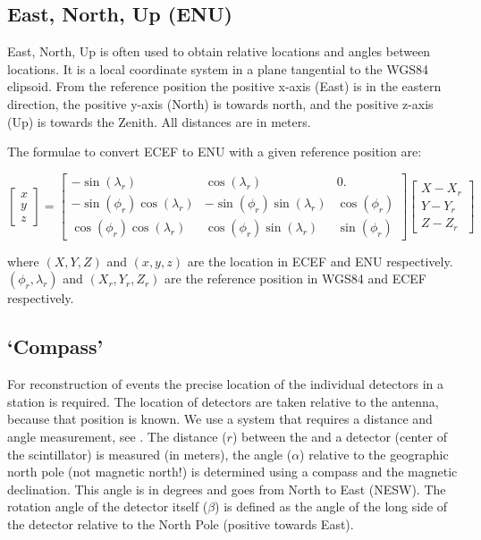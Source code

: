 \subsection{East, North, Up (ENU)}

East, North, Up is often used to obtain relative locations and angles
between locations. It is a local coordinate system in a plane tangential
to the WGS84 elipsoid. From the reference position the positive x-axis
(East) is in the eastern direction, the positive y-axis (North) is
towards north, and the positive z-axis (Up) is towards the Zenith. All
distances are in meters.

The formulae to convert ECEF to ENU with a given reference position are:

\begin{equation}
    \begin{bmatrix}
    x \\ y \\ z
    \end{bmatrix}
    =
    \begin{bmatrix}
                 -\sin(\lambda_r) &               \cos(\lambda_r) &           0. \\
    -\sin(\phi_r) \cos(\lambda_r) & -\sin(\phi_r) \sin(\lambda_r) & \cos(\phi_r) \\
     \cos(\phi_r) \cos(\lambda_r) &  \cos(\phi_r) \sin(\lambda_r) & \sin(\phi_r)
    \end{bmatrix}
    \begin{bmatrix}
    X - X_r \\ Y - Y_r \\ Z - Z_r
    \end{bmatrix}
\end{equation}

where  $(X, Y, Z)$ and $(x, y, z)$ are the location in ECEF and ENU
respectively. $(\phi_r, \lambda_r)$ and $(X_r, Y_r, Z_r)$ are the
reference position in WGS84 and ECEF respectively.


\subsection{`Compass'}

For reconstruction of events the precise location of the individual
detectors in a station is required. The location of detectors are taken
relative to the \gps antenna, because that position is known. We use a
system that requires a distance and angle measurement, see
. The distance ($r$) between the \gps and a
detector (center of the scintillator) is measured (in meters), the angle
($\alpha$) relative to the geographic north pole (not magnetic north!)
is determined using a compass and the magnetic declination. This angle
is in degrees and goes from North to East (NESW). The rotation angle of
the detector itself ($\beta$) is defined as the angle of the long side
of the detector relative to the North Pole (positive towards East).

